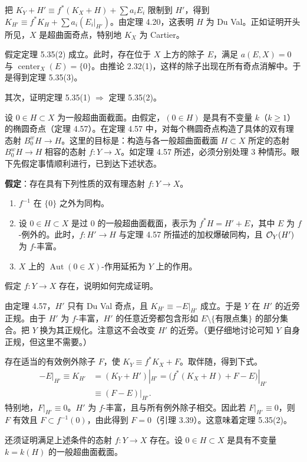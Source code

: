 把 $K_Y+H'\equiv f^*(K_X+H)+\sum a_iE_i$ 限制到 $H'$，得到 $K_{H'}\equiv f^*K_H+\sum a_i(E_i|_{H'})$。由定理 4.20，这表明 $H$ 为 Du Val。正如证明开头所见，$X$ 是超曲面奇点，特别地 $K_X$ 为 Cartier。

假定定理 5.35(2) 成立。此时，存在位于 $X$ 上方的除子 $E$，满足 $a(E,X)=0$ 与 $\operatorname{center}_X(E)=\{0\}$。由推论 2.32(1)，这样的除子出现在所有奇点消解中。于是得到定理 5.35(3)。


其次，证明定理 5.35(1) $\Rightarrow$ 定理 5.35(2)。

设 $0\in H\subset X$ 为一般超曲面截面。由假定，$(0\in H)$ 是具有不变量 $k$（$k\ge1$）的椭圆奇点（定理 4.57）。在定理 4.57 中，对每个椭圆奇点构造了具体的双有理态射 $B^w_0H\to H$。这里的目标是：构造与各一般超曲面截面 $H\subset X$ 所定的态射 $B^w_0H\to H$ 相容的态射 $f\colon Y\to X$。如定理 4.57 所述，必须分别处理 $3$ 种情形。眼下先假定事情顺利进行，已到达下述状态。

\textbf{假定}：存在具有下列性质的双有理态射 $f\colon Y\to X$。
\begin{enumerate}[label=(\arabic*),leftmargin=*]
\item $f^{-1}$ 在 $\{0\}$ 之外为同构。
\item 设 $0\in H\subset X$ 是过 $0$ 的一般超曲面截面，表示为 $f^*H=H'+E$，其中 $E$ 为 $f$-例外的。此时，$f\colon H'\to H$ 与定理 4.57 所描述的加权爆破同构，且 $\mathcal{O}_Y(H')$ 为 $f$-丰富。
\item $X$ 上的 $\operatorname{Aut}(0\in X)$-作用延拓为 $Y$ 上的作用。
\end{enumerate}

假定 $f\colon Y\to X$ 存在，说明如何完成证明。

由定理 4.57，$H'$ 只有 Du Val 奇点，且 $K_{H'}\equiv-E|_{H'}$ 成立。于是 $Y$ 在 $H'$ 的近旁正规。由于 $H'$ 为 $f$-丰富，$H'$ 的任意近旁都包含形如 $E\setminus\{\text{有限点集}\}$ 的部分集合。把 $Y$ 换为其正规化。注意这不会改变 $H'$ 的近旁。（更仔细地讨论可知 $Y$ 自身正规，但这里不需要。）

存在适当的有效例外除子 $F$，使 $K_Y\equiv f^*K_X+F$。取伴随，得到下式。
\[
\begin{aligned}
-E|_{H'}\equiv K_{H'} &= (K_Y+H')|_{H'}=\bigl(f^*(K_X+H)+F-E\bigr)|_{H'}\\
&\equiv (F-E)|_{H'}.
\end{aligned}
\]
特别地，$F|_{H'}\equiv0$。$H'$ 为 $f$-丰富，且与所有例外除子相交。因此若 $F|_{H'}\equiv0$，则 $F$ 有效且 $F\subset f^{-1}(0)$，由此得到 $F=0$（引理 3.39）。这意味着定理 5.35(2)。

还须证明满足上述条件的态射 $f\colon Y\to X$ 存在。设 $0\in H\subset X$ 是具有不变量 $k=k(H)$ 的一般超曲面截面。
